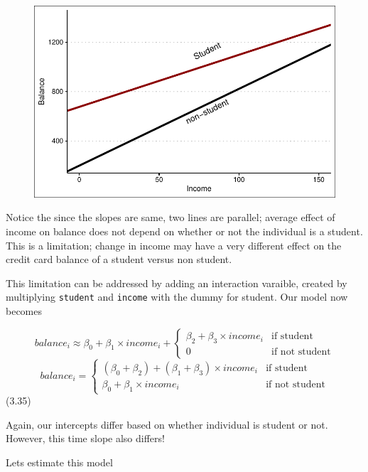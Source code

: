 \documentclass[
  letterpaper,
  DIV=11,
  numbers=noendperiod]{scrreprt}
\begin{document}
\begin{figure}[H]

{\centering \includegraphics{Chapter3_files/figure-pdf/unnamed-chunk-83-1.pdf}

}

\end{figure}

Notice the since the slopes are same, two lines are parallel; average
effect of income on balance does not depend on whether or not the
individual is a student. This is a limitation; change in income may have
a very different effect on the credit card balance of a student versus
non student.

This limitation can be addressed by adding an interaction varaible,
created by multiplying \texttt{student} and \texttt{income} with the
dummy for student. Our model now becomes

\[
balance_i \approx \beta_0 + \beta_1 \times income_i + 
\begin{cases}
\beta_2 + \beta_3 \times income_i & \text{if student} \\
0 & \text{if not student}
\end{cases}
\] \[
balance_i = 
\begin{cases}
(\beta_0 + \beta_2) + (\beta_1 + \beta_3) \times income_i & \text{if student} \\
\beta_0 + \beta_1 \times income_i & \text{if not student}
\end{cases}
\] (3.35)

Again, our intercepts differ based on whether individual is student or
not. However, this time slope also differs!

Lets estimate this model
\end{document}
